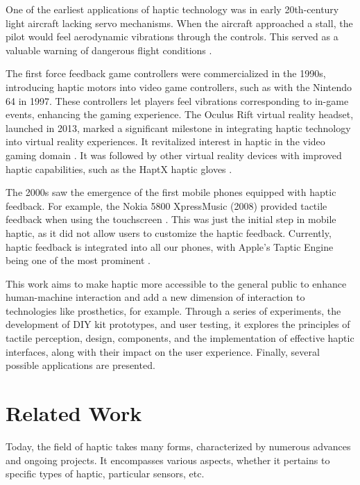 One of the earliest applications of haptic technology was in early 20th-century light aircraft lacking servo mechanisms. When the aircraft approached a stall, the pilot would feel aerodynamic vibrations through the controls. This served as a valuable warning of dangerous flight conditions \cite{van_baelen_evaluation_2019}\cite{noauthor_haptic_2023}.

The first force feedback game controllers were commercialized in the 1990s, introducing haptic motors into video game controllers, such as with the Nintendo 64 in 1997. These controllers let players feel vibrations corresponding to in-game events, enhancing the gaming experience. The Oculus Rift virtual reality headset, launched in 2013, marked a significant milestone in integrating haptic technology into virtual reality experiences. It revitalized interest in haptic in the video gaming domain \cite{saddik_haptics_2012}\cite{soderstrom_haptic_2022}. It was followed by other virtual reality devices with improved haptic capabilities, such as the HaptX haptic gloves \cite{admin_haptx_2021}.


The 2000s saw the emergence of the first mobile phones equipped with haptic feedback. For example, the Nokia 5800 XpressMusic (2008) provided tactile feedback when using the touchscreen \cite{noauthor_nokia_2023}. This was just the initial step in mobile haptic, as it did not allow users to customize the haptic feedback. Currently, haptic feedback is integrated into all our phones, with Apple's Taptic Engine being one of the most prominent \cite{noauthor_good_2023}.

This work aims to make haptic more accessible to the general public to enhance human-machine interaction and add a new dimension of interaction to technologies like prosthetics, for example. Through a series of experiments, the development of DIY kit prototypes, and user testing, it explores the principles of tactile perception, design, components, and the implementation of effective haptic interfaces, along with their impact on the user experience. Finally, several possible applications are presented.

\section{Related Work}

Today, the field of haptic takes many forms, characterized by numerous advances and ongoing projects. It encompasses various aspects, whether it pertains to specific types of haptic, particular sensors, etc.

